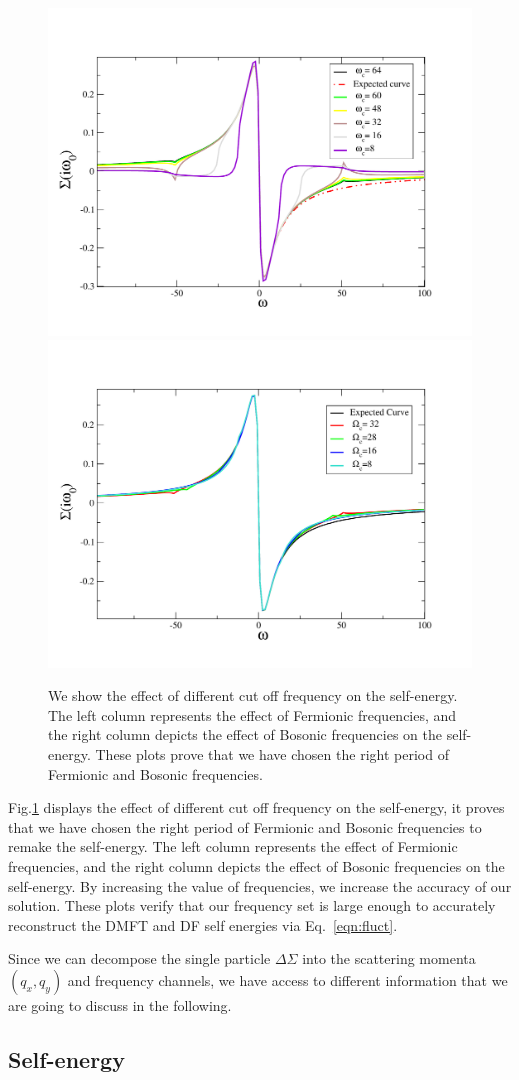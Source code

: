 \begin{figure}[ht]
\centering
    \includegraphics[width=0.50\linewidth]{fig2/self_energy_vs_nu.pdf}
    \includegraphics[width=0.50\linewidth]{fig2/self_energy_omega.pdf}
\caption{We show the effect of different cut off frequency on the self-energy. The left column represents the effect of Fermionic frequencies, and the right column depicts the effect of Bosonic frequencies on the self-energy. These plots prove that we have chosen the right period of Fermionic and Bosonic frequencies.
\label{fig:cutoff}}
\end{figure}

Fig.\ref{fig:cutoff}  displays the effect of different cut off frequency on the self-energy, it proves that we have chosen the right period of Fermionic and Bosonic frequencies to remake the self-energy. The left column represents the effect of Fermionic frequencies, and the right column depicts the effect of Bosonic frequencies on the self-energy. By increasing the value of frequencies, we increase the accuracy of our solution. 
These plots verify that our frequency set is large enough to accurately reconstruct the DMFT and DF self energies via Eq.~\eqref{eqn:fluct}.

Since we can decompose the single particle $\Delta\Sigma$ into the scattering momenta $(q_x , q_y)$ and frequency channels, we have access to different information that we are going to discuss in the following. 

\subsection{Self-energy}

